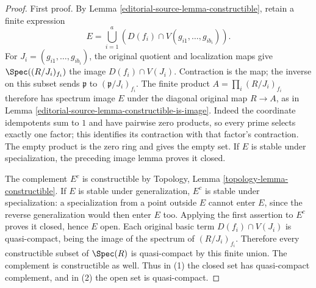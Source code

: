 \begin{proof}
First proof. By Lemma \ref{editorial-source-lemma-constructible}, retain
a finite expression
$$
E=\bigcup_{i=1}^a\left(D(f_i)\cap
V(g_{i1},\ldots,g_{ib_i})\right).
$$
For $J_i=(g_{i1},\ldots,g_{ib_i})$, the original
quotient and localization maps give
$\Spec((R/J_i)_{f_i})$ the image $D(f_i)\cap V(J_i)$.
Contraction is the map; the inverse on this subset
sends $\mathfrak p$ to $(\mathfrak p/J_i)_{f_i}$.
The finite product $A=\prod_i(R/J_i)_{f_i}$ therefore
has spectrum image $E$ under the diagonal original
map $R\to A$, as in Lemma \ref{editorial-source-lemma-constructible-is-image}.
Indeed the coordinate idempotents sum to $1$ and
have pairwise zero products, so every prime selects
exactly one factor; this identifies its contraction
with that factor's contraction. The empty product
is the zero ring and gives the empty set.
If $E$ is stable under specialization, the preceding
image lemma proves it closed.

The complement $E^c$ is constructible by
Topology, Lemma \ref{topology-lemma-constructible}.
If $E$ is stable under generalization, $E^c$ is
stable under specialization: a specialization from
a point outside $E$ cannot enter $E$, since the
reverse generalization would then enter $E$ too.
Applying the first assertion to $E^c$ proves it
closed, hence $E$ open.
Each original basic term $D(f_i)\cap V(J_i)$ is
quasi-compact, being the image of the spectrum of
$(R/J_i)_{f_i}$. Therefore every constructible subset
of $\Spec(R)$ is quasi-compact by this finite union.
The complement is constructible as well. Thus in (1)
the closed set has quasi-compact complement, and in
(2) the open set is quasi-compact.


\end{proof}
